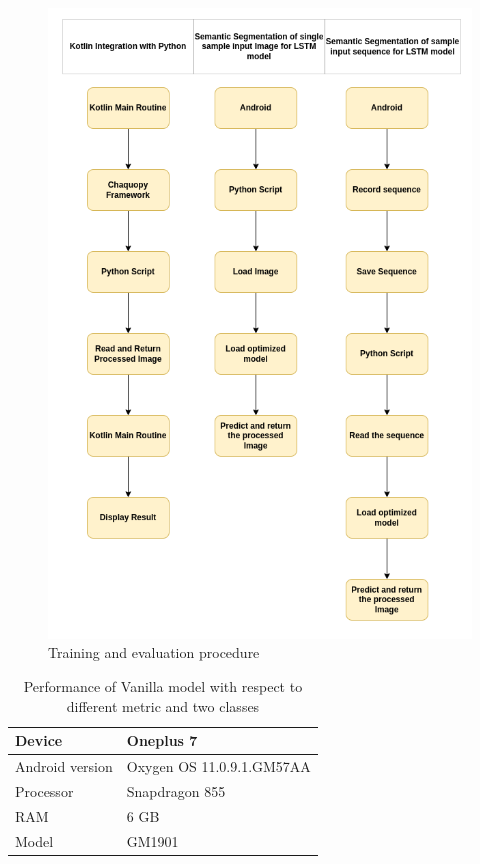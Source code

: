 	\begin{figure}
		\centering
		\includegraphics[width=13cm]{images/android_deployment.png}
		\caption{Training and evaluation procedure}
		\label{fig:android_pipeline}
	\end{figure}
	
	\begin{table}
	\begin{center}
		\begin{tabular}{ | l | p{3cm} |}
			\hline
			
			Device & Oneplus 7 \\ \hline
			Android version & Oxygen OS 11.0.9.1.GM57AA \\ \hline
			Processor & Snapdragon 855 \\ \hline
			RAM & 6 GB 
			\\ \hline
			Model & GM1901 \\ \hline
			\hline
		\end{tabular}
		\caption{Performance of Vanilla model with respect to different metric and two classes}
		\label{table:android_spec}
	\end{center}
	\end{table}

